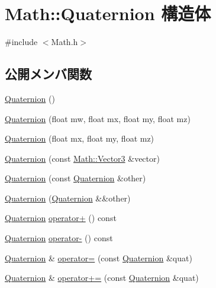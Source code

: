 \hypertarget{struct_math_1_1_quaternion}{}\section{Math\+:\+:Quaternion 構造体}
\label{struct_math_1_1_quaternion}


{\ttfamily \#include $<$Math.\+h$>$}

\subsection*{公開メンバ関数}
\begin{DoxyCompactItemize}
\item 
\mbox{\hyperlink{struct_math_1_1_quaternion_abcc01358aada56ea5f0db4da18aaf77d}{Quaternion}} ()
\item 
\mbox{\hyperlink{struct_math_1_1_quaternion_a36beaf9a73a54a368217dde43aa81cb0}{Quaternion}} (float mw, float mx, float my, float mz)
\item 
\mbox{\hyperlink{struct_math_1_1_quaternion_abe837b2cab65532540a3f8ca9a171c71}{Quaternion}} (float mx, float my, float mz)
\item 
\mbox{\hyperlink{struct_math_1_1_quaternion_aee457d8f04d226335213714897d752dd}{Quaternion}} (const \mbox{\hyperlink{struct_math_1_1_vector3}{Math\+::\+Vector3}} \&vector)
\item 
\mbox{\hyperlink{struct_math_1_1_quaternion_acae9b6b6548813cbcbd1f5b641e4f064}{Quaternion}} (const \mbox{\hyperlink{struct_math_1_1_quaternion}{Quaternion}} \&other)
\item 
\mbox{\hyperlink{struct_math_1_1_quaternion_a68ab22588ee547c1b03c58f717b5f838}{Quaternion}} (\mbox{\hyperlink{struct_math_1_1_quaternion}{Quaternion}} \&\&other)
\item 
\mbox{\hyperlink{struct_math_1_1_quaternion}{Quaternion}} \mbox{\hyperlink{struct_math_1_1_quaternion_aa22c281886948b07c70b35e0de42dc39}{operator+}} () const
\item 
\mbox{\hyperlink{struct_math_1_1_quaternion}{Quaternion}} \mbox{\hyperlink{struct_math_1_1_quaternion_aff7a0a5aeea4a3fe860cb90a649e389c}{operator-\/}} () const
\item 
\mbox{\hyperlink{struct_math_1_1_quaternion}{Quaternion}} \& \mbox{\hyperlink{struct_math_1_1_quaternion_acb64d4da834f6bc8f2cdcbd5525c05d4}{operator=}} (const \mbox{\hyperlink{struct_math_1_1_quaternion}{Quaternion}} \&quat)
\item 
\mbox{\hyperlink{struct_math_1_1_quaternion}{Quaternion}} \& \mbox{\hyperlink{struct_math_1_1_quaternion_a089bf5e8aa4d7441b364f2b7f34a64ac}{operator+=}} (const \mbox{\hyperlink{struct_math_1_1_quaternion}{Quaternion}} \&quat)

\end{DoxyCompactItemize}
